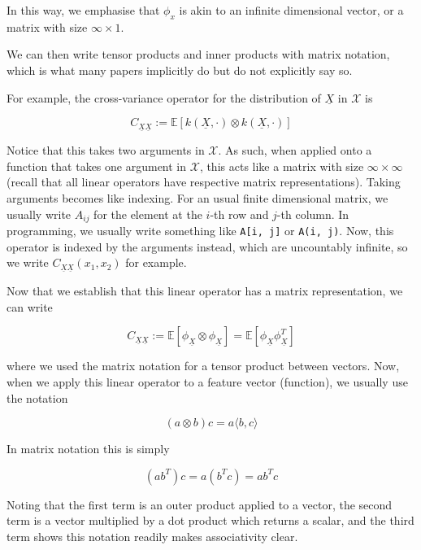 \documentclass[twoside]{article} \usepackage{aistats2017}
\newcommand{\rv}[1]{\underline{#1}}
\begin{document}
	In this way, we emphasise that $\phi_{x}$ is akin to an infinite dimensional vector, or a matrix with size $\infty \times 1$.
	
	We can then write tensor products and inner products with matrix notation, which is what many papers implicitly do but do not explicitly say so.
	
	For example, the cross-variance operator for the distribution of $\rv{X}$ in $\mathcal{X}$ is
	
		\begin{equation}
			C_{\rv{X} \rv{X}} := \mathbb{E}[k(\rv{X}, \cdot) \otimes k(\rv{X}, \cdot)]
		\end{equation}
		
	Notice that this takes two arguments in $\mathcal{X}$. As such, when applied onto a function that takes one argument in $\mathcal{X}$, this acts like a matrix with size $\infty \times \infty$ (recall that all linear operators have respective matrix representations). Taking arguments becomes like indexing. For an usual finite dimensional matrix, we usually write $A_{i j}$ for the element at the $i$-th row and $j$-th column. In programming, we usually write something like \texttt{A[i, j]} or \texttt{A(i, j)}. Now, this operator is indexed by the arguments instead, which are uncountably infinite, so we write $C_{\rv{X} \rv{X}}(x_{1}, x_{2})$ for example.
	
	Now that we establish that this linear operator has a matrix representation, we can write 

		\begin{equation}
			C_{\rv{X} \rv{X}} := \mathbb{E}[\phi_{\rv{X}} \otimes \phi_{\rv{X}}] = \mathbb{E}[\phi_{\rv{X}} \phi_{\rv{X}}^{T}]
		\end{equation}
	
	where we used the matrix notation for a tensor product between vectors. Now, when we apply this linear operator to a feature vector (function), we usually use the notation
	
		\begin{equation}
			(a \otimes b) c = a \langle b, c \rangle
		\end{equation}
		
	In matrix notation this is simply
	
		\begin{equation}
			(a b^{T}) c = a (b^{T} c) = a b^{T} c
		\end{equation}
		
	Noting that the first term is an outer product applied to a vector, the second term is a vector multiplied by a dot product which returns a scalar, and the third term shows this notation readily makes associativity clear.
	
\end{document}

